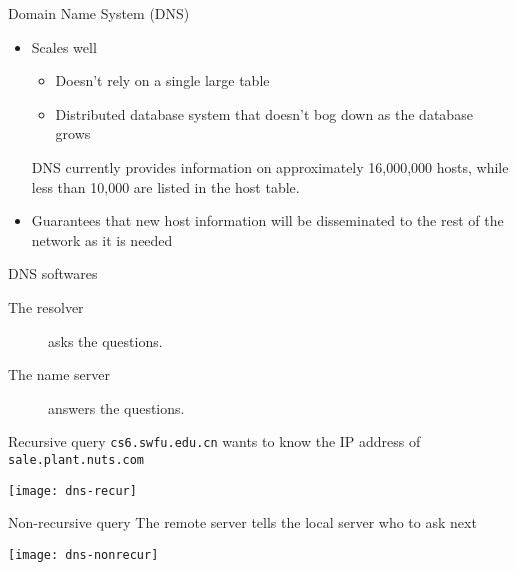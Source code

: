 \begin{frame}{Domain Name System (DNS)}
  \begin{itemize}
  \item Scales well
    \begin{itemize}
    \item Doesn't rely on a single large table
    \item Distributed database system that doesn't bog down as the database grows
    \end{itemize}
    DNS currently provides information on approximately 16,000,000 hosts, while less than
    10,000 are listed in the host table.
  \item Guarantees that new host information will be disseminated to the rest of the
    network as it is needed
  \end{itemize}
\end{frame}

\begin{frame}{DNS softwares}
  \begin{center}
     
  \end{center}
  \begin{description}
  \item[The resolver]  asks the questions.
  \item[The name server]  answers the questions.
  \end{description}
\end{frame}

\begin{frame}
  \begin{iblock}{Recursive query}
    \texttt{cs6.swfu.edu.cn} wants to know the IP address of \texttt{sale.plant.nuts.com}
    \begin{center}
      \texttt{[image: dns-recur]}
    \end{center}
  \end{iblock}
  \begin{iblock}{Non-recursive query}
    The remote server tells the local server who to ask next
    \begin{center}
      \texttt{[image: dns-nonrecur]}\label{fig:non_recursive}
    \end{center}
  \end{iblock}
\end{frame}

